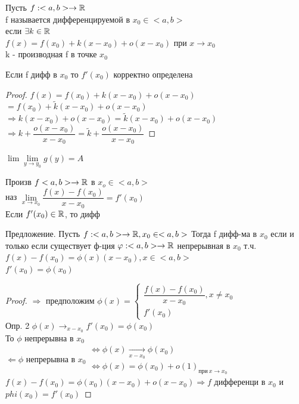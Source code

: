 
\begin{definition}
	Пусть $ f : <a, b> \rightarrow \mathbb{R} $ \\
	f называется дифференцируемой в $ x_0 \in <a, b> $ \\
	если $ \exists k \in \mathbb{R} $ \\
	$ f(x) = f(x_0) + k(x - x_0) + o(x - x_0) $ при $ x \rightarrow x_0 $\\
	k - производная f в точке $ x_0 $
	\begin{lemma}
		Если f дифф в $ x_0 $ то $ f'(x_0) $ корректно определена 
		\begin{proof}
			$ f(x) = f(x_0) + k(x - x_0) + o(x - x_0) $ \\
			$ = f(x_0) + \tilde{k}(x - x_0) + o(x - x_0) $ \\
			$ \Rightarrow k(x-x_0) + o(x-x_0) = \tilde{k} (x -x_0) + o(x-x_0) $\\
			$ \Rightarrow k+\dfrac{o(x-x_0)}{x - x_0} = \tilde{k} + \dfrac{o(x-x_0)}{x-x_0} $ 
		\end{proof}$ \lim\lim\limits_{y \rightarrow y_0} g(y) = A $\\
	\end{lemma}
\end{definition}
\begin{definition}
	Произв $ f<a,b> \rightarrow \mathbb{R} $ в $ x_o \in <a,b> $ \\
	наз $ \lim\limits_{x \rightarrow x_0} \dfrac{f(x) - f(x_0)}{x - x_0} = f'(x_0) $ \\
	Если $ f'(x_0) \in \mathbb{R}$, то дифф 
\end{definition}

Предложение. Пусть $ f : <a, b> \rightarrow \mathbb{R}, x_0 \in <a, b> $ Тогда f дифф-ма в $x_0$ если и только если существует ф-ция $ \varphi : <a,b> \rightarrow \mathbb{R} $ непрерывная в $x_0$ т.ч. $ f(x) - f(x_0) = \phi(x) (x-x_0), x \in <a,b> $ \\
$ f'(x_0) = \phi(x_0) $\\
\begin{proof} 
	$\Rightarrow$ предположим $ \phi(x) = \left\{ \begin{array}{ll}
		 \dfrac{f(x) - f(x_0)}{x - x_0}, x \neq x_0 \\
		 f'(x_0)
	\end{array} \right. $ \\
	Опр. 2 $ \phi(x) \rightarrow_{x - x_0} f'(x_0) = \phi(x_0) $\\
	То $\phi$ непрерывна в $x_0$ \\
	$\Leftarrow \phi$ непрерывна в $ x_0 \begin{array}{l} \Leftrightarrow \phi(x) \xrightarrow[{x - x_0}]{} \phi(x_0) \\
	\Leftrightarrow \phi(x)  = \phi(x_0) + o(1)_{\text{при} \ x \rightarrow x_0} \end{array} $ \\
	$ f(x) - f(x_0) = \phi(x_0) (x - x_0) + o(x-x_0) \Rightarrow f $ дифференци в $ x_0 $ и $phi(x_0) = f'(x_0) $    
\end{proof} 


